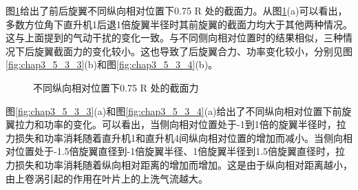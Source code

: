 图\ref{fig:chap3_5_3_2}给出了前后旋翼不同纵向相对位置下0.75 R 处的截面力。从图\ref{fig:chap3_5_3_2}(a)可以看出，多数方位角下直升机1后退1倍旋翼半径时其前旋翼的截面力均大于其他两种情况。这与上面提到的气动干扰的变化一致。与不同侧向相对位置时的结果相似，三种情况下后旋翼截面力的变化较小。这也导致了后旋翼合力、功率变化较小，分别见图\ref{fig:chap3_5_3_3}(b)和图\ref{fig:chap3_5_3_4}(b)。
\begin{figure}[!htb]
  \centering
  \quad
  \caption{不同纵向相对位置下0.75 R 处的截面力}
  \label{fig:chap3_5_3_2}
\end{figure}

图\ref{fig:chap3_5_3_3}(a)和图\ref{fig:chap3_5_3_4}(a)给出了不同纵向相对位置下前旋翼拉力和功率的变化。可以看出，当侧向相对位置处于-1到1倍的旋翼半径时，拉力损失和功率消耗随着直升机1和直升机4间纵向相对位置的增加而减小。当侧向相对位置处于-1.5倍旋翼直径到-1倍旋翼半径、1倍旋翼半径到1.5倍旋翼直径时，拉力损失和功率消耗随着纵向相对距离的增加而增加。这是由于纵向相对距离越小，由上卷涡引起的作用在叶片上的上洗气流越大。

